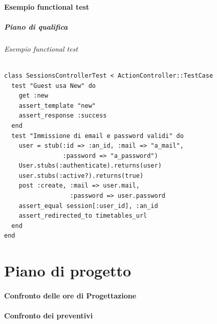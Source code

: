 \documentclass[10pt]{beamer}
\begin{document}
\subsection{Esempio functional test}
\begin{frame}[fragile]
  \frametitle{Piano di qualifica}
  \framesubtitle{Esempio functional test}
\begin{small}
\begin{verbatim}
class SessionsControllerTest < ActionController::TestCase
  test "Guest usa New" do
    get :new
    assert_template "new"
    assert_response :success
  end
  test "Immissione di email e password validi" do
    user = stub(:id => :an_id, :mail => "a_mail",
                :password => "a_password")
    User.stubs(:authenticate).returns(user)
    user.stubs(:active?).returns(true)
    post :create, :mail => user.mail,
                  :password => user.password
    assert_equal session[:user_id], :an_id
    assert_redirected_to timetables_url
  end
end
\end{verbatim} 
\end{small}
\end{frame}
\part{Piano di progetto}
\frame{
	\transsplitverticalin
	\partpage }
\subsection{Confronto delle ore di Progettazione}
\subsection{Confronto dei preventivi}
\end{document}
